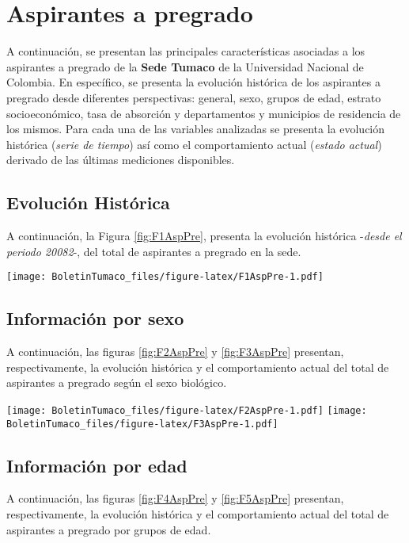 \documentclass[
]{book}
\begin{document}
\hypertarget{AspPre}{%
\section{Aspirantes a pregrado}\label{AspPre}}

A continuación, se presentan las principales características asociadas a los aspirantes a pregrado de la \textbf{Sede Tumaco} de la Universidad Nacional de Colombia. En específico, se presenta la evolución histórica de los aspirantes a pregrado desde diferentes perspectivas: general, sexo, grupos de edad, estrato socioeconómico, tasa de absorción y departamentos y municipios de residencia de los mismos. Para cada una de las variables analizadas se presenta la evolución histórica (\emph{serie de tiempo}) así como el comportamiento actual (\emph{estado actual}) derivado de las últimas mediciones disponibles.

\hypertarget{evoluciuxf3n-histuxf3rica}{%
\subsection{Evolución Histórica}\label{evoluciuxf3n-histuxf3rica}}

A continuación, la Figura \ref{fig:F1AspPre}, presenta la evolución histórica -\emph{desde el periodo 20082}-, del total de aspirantes a pregrado en la sede.

\texttt{[image: BoletinTumaco\_files/figure-latex/F1AspPre-1.pdf]}

\hypertarget{informaciuxf3n-por-sexo}{%
\subsection{Información por sexo}\label{informaciuxf3n-por-sexo}}

A continuación, las figuras \ref{fig:F2AspPre} y \ref{fig:F3AspPre} presentan, respectivamente, la evolución histórica y el comportamiento actual del total de aspirantes a pregrado según el sexo biológico.

\texttt{[image: BoletinTumaco\_files/figure-latex/F2AspPre-1.pdf]}
\texttt{[image: BoletinTumaco\_files/figure-latex/F3AspPre-1.pdf]}

\hypertarget{informaciuxf3n-por-edad}{%
\subsection{Información por edad}\label{informaciuxf3n-por-edad}}

A continuación, las figuras \ref{fig:F4AspPre} y \ref{fig:F5AspPre} presentan, respectivamente, la evolución histórica y el comportamiento actual del total de aspirantes a pregrado por grupos de edad.
\end{document}
